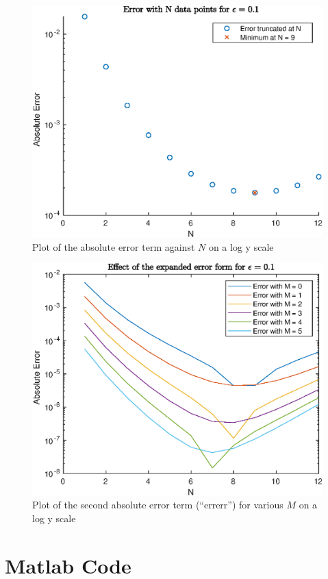 \documentclass{/home/janmebows/Documents/LatexTemplates/myassignment}
\begin{document}
\begin{enumerate}
\begin{enumerate}
        \begin{figure}
        \centering
        \label{fig:3c1}
        \includegraphics{TopicCA1Q3c1}
        \caption{Plot of the absolute error term against $N$ on a log y scale}
        \end{figure}
        \begin{figure}
        \centering
        \label{fig:3c2}
        \includegraphics{TopicCA1Q3c2}
        \caption{Plot of the second absolute error term (``errerr'') for various $M$ on a log y scale}
        \end{figure}
    \end{enumerate}
\end{enumerate}

\clearpage

\section*{Matlab Code}




\end{document}
